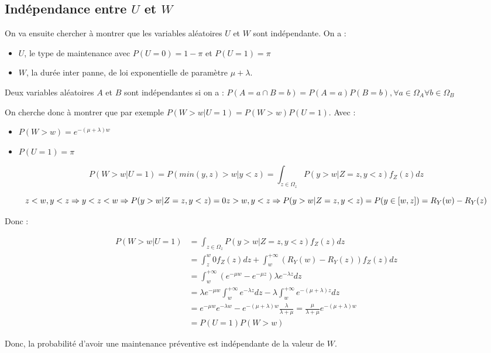 \documentclass[
]{article}
\providecommand{\tightlist}{%
  \setlength{\itemsep}{0pt}\setlength{\parskip}{0pt}}
\begin{document}
\subsection{\texorpdfstring{Indépendance entre \(U\) et
\(W\)}{Indépendance entre U et W}}\label{induxe9pendance-entre-u-et-w}

On va ensuite chercher à montrer que les variables aléatoires \(U\) et
\(W\) sont indépendante. On a :

\begin{itemize}
\tightlist
\item
  \(U\), le type de maintenance avec \(P(U=0)=1-\pi\) et \(P(U=1)=\pi\)
\item
  \(W\), la durée inter panne, de loi exponentielle de paramètre
  \(\mu+\lambda\).
\end{itemize}

Deux variables aléatoires \(A\) et \(B\) sont indépendantes si on a :
\(P(A=a \cap B=b)=P(A=a)P(B=b), \forall a\in \Omega_A \forall b \in \Omega_B\)

On cherche donc à montrer que par exemple \(P(W>w|U=1)=P(W>w)P(U=1)\).
Avec :

\begin{itemize}
\tightlist
\item
  \(P(W>w)=e^{-(\mu+\lambda)w}\)
\item
  \(P(U=1)=\pi\)
\end{itemize}

\[
P(W>w|U=1) = P(min(y,z)>w|y<z) = \int_{z\in \Omega_z}
P(y>w|Z=z,y<z)f_Z(z)dz
\]

\[
z < w, y < z \Rightarrow y <z < w \Rightarrow P(y>w|Z=z,y<z)=0 \\
z > w, y < z \Rightarrow P(y>w|Z=z,y<z)=
P(y\in[w,z])=R_Y(w)-R_Y(z)
\]

Donc :

\[
\begin{array}{ll}
P(W>w|U=1) & = \int_{z\in \Omega_z} P(y>w|Z=z,y<z)f_Z(z)dz \\
& = \int_{z}^{w}0f_Z(z)dz + \int_{w}^{+\infty}(R_Y(w)-R_Y(z))f_Z(z)dz \\
& = \int_{w}^{+\infty} \left( e^{-\mu w} - e^{-\mu z} \right) \lambda
e^{-\lambda z} dz \\
& = \lambda e^{-\mu w} \int_{w}^{+\infty}e^{-\lambda z}dz - 
\lambda \int_{w}^{+\infty} e^{-(\mu + \lambda) z}dz \\
& = e^{-\mu w} e^{-\lambda w} - e^{-(\mu + \lambda)w}\frac{\lambda}{\lambda+\mu}
= \frac{\mu}{\lambda + \mu}e^{-(\mu + \lambda)w} \\
& = P(U=1)P(W>w)
\end{array}
\]

Donc, la probabilité d'avoir une maintenance préventive est indépendante
de la valeur de \(W\).
\end{document}
